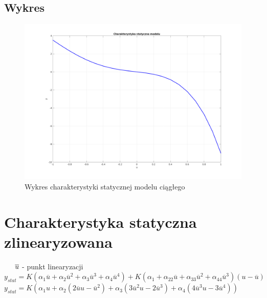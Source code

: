 \documentclass[a4paper, 11pt]{article}
\begin{document}
\subsection{Wykres}
\begin{figure}[H]
\centering
\includegraphics[scale=0.5]{statyczna.png}
\caption{Wykres charakterystyki statycznej modelu ciągłego}
\end{figure}


\section{Charakterystyka statyczna zlinearyzowana}

$\indent \overline{u}$ - punkt linearyzacji 
\\

$y_{stat} = K(\alpha_1\overline{u} + \alpha_2\overline{u}^2 + \alpha_3\overline{u}^3 + \alpha_4\overline{u}^4)
+ K(\alpha_1 + \alpha_22\overline{u} + \alpha_33\overline{u}^2 + \alpha_44\overline{u}^3)(u-\overline{u})$
\\

$y_{stat} = K(\alpha_1u + \alpha_2(2\overline{u}u - \overline{u}^2)+ \alpha_3(3\overline{u}^2u-2\overline{u}^3) + \alpha_4(4\overline{u}^3u - 3\overline{u}^4))$
\end{document}
